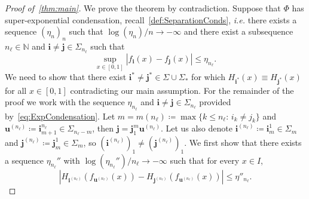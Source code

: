 \documentclass[12pt,]{article}
\theoremstyle{definition}
\theoremstyle{remark}
\renewcommand{\Bbb}[1]{\mathbb{#1}}
\newcommand{\bbN}{{\Bbb N}}         %
\newcommand{\0}{\mathbf{0}}
\newcommand{\bi}{\mathbf{i}}
\newcommand{\bj}{\mathbf{j}}
\newcommand{\bu}{\mathbf{u}}
\begin{document}
{\begin{proof}[Proof of~\cref{thm:main}]
We prove the theorem by contradiction. Suppose that $\Phi$ has super-exponential
condensation, recall~\cref{def:SeparationConds}, \emph{i.e.} there exists a sequence $(\eta_n)_n$ such that $\log(\eta_n)/n\to-\infty$ and there exist a subsequence $n_{\ell}\in\bbN$ and $\bi\neq\bj\in\Sigma_{n_\ell}$ such that
\begin{equation}\label{eq:ExpCondensation}
  \sup_{x\in[0,1]}|f_{\bi}(x)-f_{\bj}(x)| \leq \eta_{n_\ell}.
\end{equation}
We need to show that there exist $\bi^*\neq\bj^*\in\Sigma\cup\Sigma_*$ for which $H_{\bi^*}(x)\equiv H_{\bj^*}(x)$ for all $x\in[0,1]$ contradicting our main assumption. For the remainder of the proof we work with the sequence $\eta_{n_{\ell}}$ and $\bi\neq\bj\in\Sigma_{n_\ell}$ provided by~\cref{eq:ExpCondensation}. Let $m=m(n_{\ell})\coloneqq\max\{k\leq n_{\ell}:\, i_k\neq j_k\}$ and $\bu^{(n_{\ell})}\coloneqq \bi_{m+1}^{n_{\ell}}\in\Sigma_{n_\ell-m}$, then $\bj=\bj_1^m\bu^{(n_{\ell})}$. Let us also denote $\bi^{(n_{\ell})}\coloneqq\bi_m^1\in\Sigma_m$ and $\bj^{(n_{\ell})}\coloneqq\bj_m^1\in\Sigma_m$, so $(\bi^{(n_{\ell})})_1\neq (\bj^{(n_{\ell})})_1$. We first show that there exists a sequence $\eta_{n_{\ell}}''$ with $\log(\eta_{n_{\ell}}'')/n_{\ell}\to-\infty$ such that for every $x\in I$,
\begin{equation}\label{eq:DiffH_iSUperExp}
|H_{\bi^{(n_\ell)}}(f_{\bu^{(n_\ell)}}(x)) - H_{\bj^{(n_\ell)}}(f_{\bu^{(n_\ell)}}(x))| \leq \eta''_{n_\ell}.
\end{equation}


\end{proof}}
\end{document}
